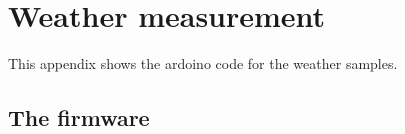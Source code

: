 \chapter{Weather measurement}\label{ap:wet_code}
This appendix shows the ardoino code for the weather samples.


\section*{The firmware}




